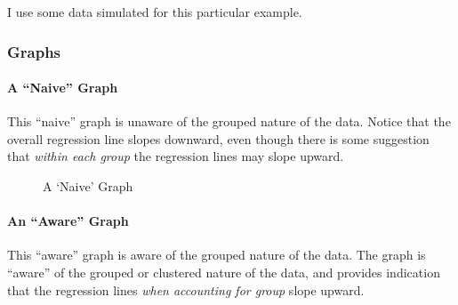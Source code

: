 \documentclass[
  letterpaper,
  DIV=11,
  numbers=noendperiod]{scrreprt}
\let\oldparagraph\paragraph
\renewcommand{\paragraph}[1]{\oldparagraph{#1}\mbox{}}
\begin{document}
I use some data simulated for this particular example.

\subsubsection{Graphs}\label{graphs}

\paragraph{A ``Naive'' Graph}\label{a-naive-graph}

This ``naive'' graph is unaware of the grouped nature of the data.
Notice that the overall regression line slopes downward, even though
there is some suggestion that \emph{within each group} the regression
lines may slope upward.

\begin{figure}


\caption{\label{fig-naive}A `Naive' Graph}

\end{figure}%

\paragraph{An ``Aware'' Graph}\label{an-aware-graph}

This ``aware'' graph is aware of the grouped nature of the data. The
graph is ``aware'' of the grouped or clustered nature of the data, and
provides indication that the regression lines \emph{when accounting for
group} slope upward.
\end{document}
